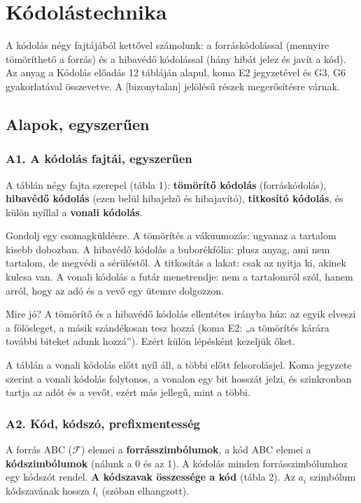 \setcounter{chapter}{5}
\chapter{\texorpdfstring{Kódolástechnika}{Kódolástechnika}}\label{f6}
A kódolás négy fajtájából kettővel számolunk: a forráskódolással (mennyire tömöríthető a forrás) és a hibavédő kódolással (hány hibát jelez és javít a kód). Az anyag a Kódolás előadás 12 tábláján alapul, koma E2 jegyzetével és G3, G6 gyakorlatával összevetve. A [bizonytalan] jelölésű részek megerősítésre várnak.

\section{Alapok, egyszerűen}
\subsection{\texorpdfstring{A1. A kódolás fajtái, egyszerűen}{A1. A kódolás fajtái, egyszerűen}}\label{a6-fajtak}
A táblán négy fajta szerepel (tábla 1): \textbf{tömörítő kódolás} (forráskódolás), \textbf{hibavédő kódolás} (ezen belül hibajelző és hibajavító), \textbf{titkosító kódolás}, és külön nyíllal a \textbf{vonali kódolás}.

Gondolj egy csomagküldésre. A tömörítés a vákuumozás: ugyanaz a tartalom kisebb dobozban. A hibavédő kódolás a buborékfólia: plusz anyag, ami nem tartalom, de megvédi a sérüléstől. A titkosítás a lakat: csak az nyitja ki, akinek kulcsa van. A vonali kódolás a futár menetrendje: nem a tartalomról szól, hanem arról, hogy az adó és a vevő egy ütemre dolgozzon.

Mire jó? A tömörítő és a hibavédő kódolás ellentétes irányba húz: az egyik elveszi a fölösleget, a másik szándékosan tesz hozzá (koma E2: „a tömörítés kárára további biteket adunk hozzá”). Ezért külön lépésként kezeljük őket.

A táblán a vonali kódolás előtt nyíl áll, a többi előtt felsorolásjel. Koma jegyzete szerint a vonali kódolás folytonos, a vonalon egy bit hosszát jelzi, és szinkronban tartja az adót és a vevőt, ezért más jellegű, mint a többi.

\subsection{\texorpdfstring{A2. Kód, kódszó, prefixmentesség}{A2. Kód, kódszó, prefixmentesség}}\label{a6-kod}
A forrás ABC ($\mathcal F$) elemei a \textbf{forrásszimbólumok}, a kód ABC elemei a \textbf{kódszimbólumok} (nálunk a 0 és az 1). A kódolás minden forrásszimbólumhoz egy kódszót rendel. \textbf{A kódszavak összessége a kód} (tábla 2). Az $a_i$ szimbólum kódszavának hossza $l_i$ (szóban elhangzott).

